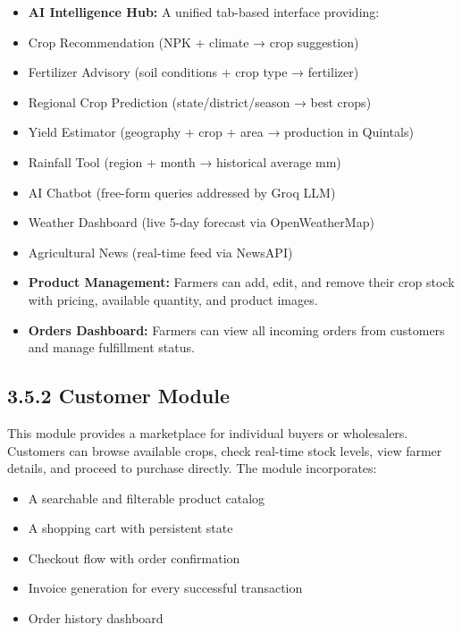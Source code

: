 \documentclass[12pt,a4paper]{report}
\begin{document}
\begin{itemize}
\item \textbf{AI Intelligence Hub:} A unified tab-based interface providing:
\item Crop Recommendation (NPK + climate → crop suggestion)
\item Fertilizer Advisory (soil conditions + crop type → fertilizer)
\item Regional Crop Prediction (state/district/season → best crops)
\item Yield Estimator (geography + crop + area → production in Quintals)
\item Rainfall Tool (region + month → historical average mm)
\item AI Chatbot (free-form queries addressed by Groq LLM)
\item Weather Dashboard (live 5-day forecast via OpenWeatherMap)
\item Agricultural News (real-time feed via NewsAPI)
\end{itemize}
\begin{itemize}
\item \textbf{Product Management:} Farmers can add, edit, and remove their crop stock with pricing, available quantity, and product images.
\end{itemize}
\begin{itemize}
\item \textbf{Orders Dashboard:} Farmers can view all incoming orders from customers and manage fulfillment status.
\end{itemize}
\subsection{3.5.2 Customer Module}

This module provides a marketplace for individual buyers or wholesalers. Customers can browse available crops, check real-time stock levels, view farmer details, and proceed to purchase directly. The module incorporates:

\begin{itemize}
\item A searchable and filterable product catalog
\item A shopping cart with persistent state
\item Checkout flow with order confirmation
\item Invoice generation for every successful transaction
\item Order history dashboard
\end{itemize}
\end{document}
